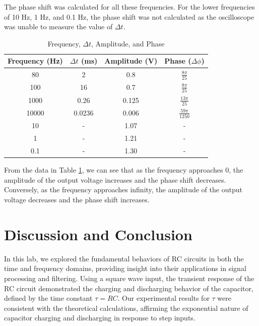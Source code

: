 \documentclass[12pt]{article}
\begin{document}
The phase shift was calculated for all these frequencies. For the lower frequencies 
of 10 Hz, 1 Hz, and 0.1 Hz, the phase shift was not calculated as the oscilloscope 
was unable to measure the value of $\Delta t$.
\begin{table}[H]
    \centering
    \begin{tabular}{|c|c|c|c|}
        \hline
        Frequency (Hz) & $\Delta t$ (ms) & Amplitude (V) & Phase ($\Delta \phi$) \\
        \hline
        80    & 2    	& 0.8 	& $\frac{8 \pi}{25}$ \\
        \hline
        100   & 16   	& 0.7 	& $\frac{8 \pi}{25}$\\
        \hline
        1000  & 0.26  	& 0.125 & $\frac{13 \pi}{25}$ \\
        \hline
        10000 & 0.0236  & 0.006 & $\frac{59 \pi}{1250}$ \\
        \hline
        10    & -   	& 1.07 	& - \\
        \hline
        1     & -   	& 1.21 	& - \\
        \hline
        0.1   & -   	& 1.30 	& - \\
        \hline
    \end{tabular}
    \caption{Frequency, $\Delta t$, Amplitude, and Phase}
    \label{tab:frequency_phase}
\end{table}

From the data in Table \ref{tab:frequency_phase}, we can see that as the frequency
approaches 0, the amplitude of the output voltage increases and the phase shift decreases.
Conversely, as the frequency approaches infinity, the amplitude of the output 
voltage decreases and the phase shift increases.

\section{Discussion and Conclusion}

In this lab, we explored the fundamental behaviors of RC circuits in both the time and frequency domains, providing insight into their applications in signal processing and filtering. Using a square wave input, the transient response of the RC circuit demonstrated the charging and discharging behavior of the capacitor, defined by the time constant \( \tau = RC \). Our experimental results for \( \tau \) were consistent with the theoretical calculations, affirming the exponential nature of capacitor charging and discharging in response to step inputs.
\newline
\end{document}
